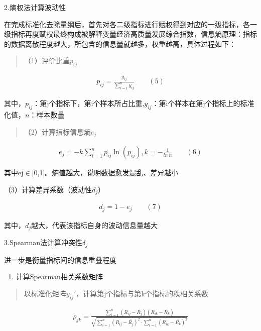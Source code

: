 \documentclass[UTF8,a4paper,12pt,fontset=windows]{ctexart}
\begin{document}
2.熵权法计算波动性

在完成标准化去除量纲后，首先对各二级指标进行赋权得到对应的一级指标，各一级指标再度赋权最终构成被解释变量经济高质量发展综合指数，信息熵原理：指标的数据离散程度越大，所包含的信息量就越多，权重越高，具体过程如下：

\begin{quote}
（1）评价比重\(p_{ij}\)
\end{quote}

\[\begin{array}{r}
p_{ij} = \frac{y_{ij}}{\sum_{i = 1}^{n}y_{ij}}\qquad(5)
\end{array}\]

其中，\(p_{ij}\)：第j个指标下，第i个样本所占比重,\(y_{ij}\)：第i个样本在第j个指标上的标准化值，\(n\)：样本数量

\begin{quote}
（2）计算指标信息熵\(e_{j}\)
\end{quote}

\[\begin{array}{r}
e_{j} = - k\sum_{i = 1}^{n}{p_{ij}\ln\left( p_{ij} \right)},k = - \frac{1}{ln\ n}\qquad(6)
\end{array}\]

其中ej\(\in\){[}0,1{]}。熵值越大，说明数据愈发混乱、差异越小

（3）计算差异系数（波动性\(d_{j}\)）

\[\begin{array}{r}
d_{j} = 1 - e_{j}\qquad(7)
\end{array}\]

其中，\(d_{j}\)越大，代表该指标自身的波动信息量越大

3.Spearman法计算冲突性\(\delta_{j}\)

进一步是衡量指标间的信息重叠程度

\begin{enumerate}
\item
  计算Spearman相关系数矩阵
\end{enumerate}

\begin{quote}
以标准化矩阵\(y_{ij}'\)，计算第j个指标与第k个指标的秩相关系数
\end{quote}

\[\begin{array}{r}
\rho_{jk} = \frac{\sum_{i = 1}^{n}{\left( R_{ij} - \overline{R_{j}} \right)\left( R_{ik} - \overline{R_{k}} \right)}}{\sqrt{\sum_{i = 1}^{n}\left( R_{ij} - \overline{R_{j}} \right)^{2} \cdot \sum_{i = 1}^{n}\left( R_{ik} - \overline{R_{k}} \right)^{2}}}
\end{array}\]
\end{document}
